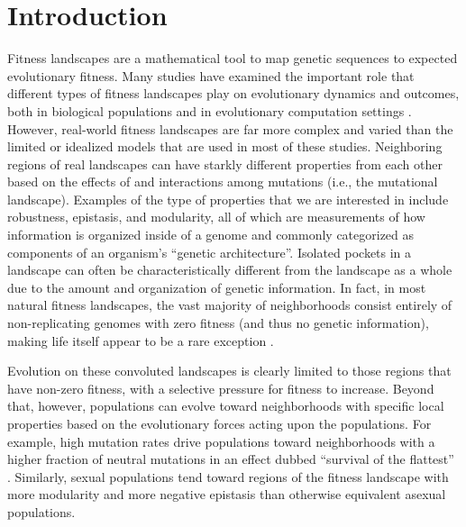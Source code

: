 \documentclass[letterpaper]{article}
\begin{document}
\section{Introduction}

Fitness landscapes are a mathematical tool to map genetic sequences to expected evolutionary fitness. Many studies have examined the important role that different types of fitness landscapes play on evolutionary dynamics and outcomes, both in biological populations \citep{khan_negative_2011,szendro_quantitative_2013,weinreich_darwinian_2006,nahum_tortoisehare_2015} and in evolutionary computation settings \citep{merz_fitness_2000,humeau_paradiseo-mo:_2013,kallel_theoretical_2013}. However, real-world fitness landscapes are far more complex and varied than the limited or idealized models that are used in most of these studies. Neighboring regions of real landscapes can have starkly different properties from each other based on the effects of and interactions among mutations (i.e., the mutational landscape).  Examples of the type of properties that we are interested in include robustness, epistasis, and modularity, all of which are measurements of how information is organized inside of a genome and commonly categorized as components of an organism's ``genetic architecture''.  Isolated pockets in a landscape can often be characteristically different from the landscape as a whole due to the amount and organization of genetic information.  In fact, in most natural fitness landscapes, the vast majority of neighborhoods consist entirely of non-replicating genomes with zero fitness (and thus no genetic information), making life itself appear to be a rare exception \citep{gavrilets_fitness_2004}.

Evolution on these convoluted landscapes is clearly limited to those regions that have non-zero fitness, with a selective pressure for fitness to increase. Beyond that, however, populations can evolve toward neighborhoods with specific local properties based on the evolutionary forces acting upon the populations.  For example, high mutation rates drive populations toward neighborhoods with a higher fraction of neutral mutations in an effect dubbed “survival of the flattest” \citep{wilke_evolution_2001}. Similarly, sexual populations tend toward regions of the fitness landscape with more modularity \citep{misevic_sexual_2006} and more negative epistasis \citep{misevic_experiments_2010} than otherwise equivalent asexual populations.
\end{document}
